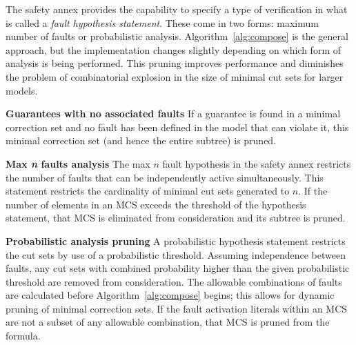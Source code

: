 The safety annex provides the capability to specify a type of verification in what is called a \textit{fault hypothesis statement}. These come in two forms: maximum number of faults or probabilistic analysis. Algorithm~\ref{alg:compose} is the general approach, but the implementation changes slightly depending on which form of analysis is being performed. This pruning improves performance and diminishes the problem of combinatorial explosion in the size of minimal cut sets for larger models. 

\textbf{Guarantees with no associated faults} If a guarantee is found in a minimal correction set and no fault has been defined in the model that can violate it, this minimal correction set (and hence the entire subtree) is pruned.

\textbf{Max \textit{n} faults analysis} The max $n$ fault hypothesis in the safety annex restricts the number of faults that can be independently active simultaneously. This statement restricts the cardinality of minimal cut sets generated to $n$. If the number of elements in an MCS exceeds the threshold of the hypothesis statement, that MCS is eliminated from consideration and its subtree is pruned.


\textbf{Probabilistic analysis pruning} A probabilistic hypothesis statement restricts the cut sets by use of a probabilistic threshold. Assuming independence between faults, any cut sets with combined probability higher than the given probabilistic threshold are removed from consideration. The allowable combinations of faults are calculated before Algorithm~\ref{alg:compose} begins; this allows for dynamic pruning of minimal correction sets. If the fault activation literals within an MCS are not a subset of any allowable combination, that MCS is pruned from the formula. 










